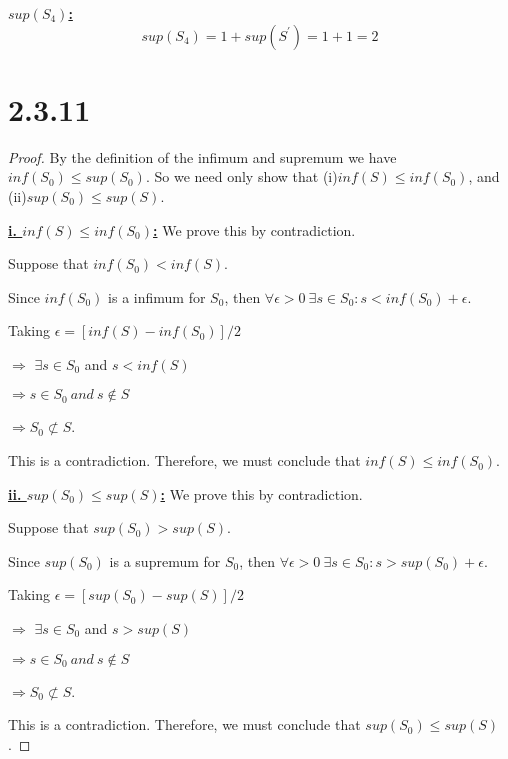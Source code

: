 \documentclass{article}
\begin{document}
\noindent
\textbf{\underline{$sup(S_4)$:}} 
\begin{equation*}
  sup(S_4) = 1 + sup(S^\prime) = 1 + 1 = 2
\end{equation*}

\section*{2.3.11}
\begin{proof}
  By the definition of the infimum and supremum we have $inf(S_0) \leq sup(S_0)$. So we need only show that (i)$inf(S) \leq inf(S_0)$, and (ii)$sup(S_0) \leq sup(S)$.
  \newline

  \noindent
  \textbf{\underline{i. $inf(S) \leq inf(S_0)$:}}
  We prove this by contradiction.
  
  \noindent
  Suppose that $inf(S_0) < inf(S)$. 
  
  \noindent
  Since $inf(S_0)$ is a infimum for $S_0$, then $\forall \epsilon > 0 \ \exists s \in S_0: s < inf(S_0) + \epsilon$.
  
  \noindent
  Taking $\epsilon = [inf(S) - inf(S_0)] / 2$
  
  \noindent 
  $\Rightarrow$ $\exists s \in S_0$ and $s < inf(S)$
  
  \noindent
  $\Rightarrow s \in S_0 \ and \  s \notin S$

  \noindent
  $\Rightarrow S_0 \not\subset S$.
  
  \noindent
  This is a contradiction. Therefore, we must conclude that $inf(S) \leq inf(S_0)$.
  \newline

  \noindent
  \textbf{\underline{ii. $sup(S_0) \leq sup(S)$:}}
  We prove this by contradiction.
  
  \noindent
  Suppose that $sup(S_0) > sup(S)$. 
  
  \noindent
  Since $sup(S_0)$ is a supremum for $S_0$, then $\forall \epsilon > 0 \ \exists s \in S_0: s > sup(S_0) + \epsilon$.
  
  \noindent
  Taking $\epsilon = [sup(S_0) - sup(S)] / 2$
  
  \noindent 
  $\Rightarrow$ $\exists s \in S_0$ and $s > sup(S)$
  
  \noindent
  $\Rightarrow s \in S_0 \ and \  s \notin S$

  \noindent
  $\Rightarrow S_0 \not\subset S$.
  
  \noindent
  This is a contradiction. Therefore, we must conclude that $sup(S_0) \leq sup(S)$.

\end{proof}
\end{document}
